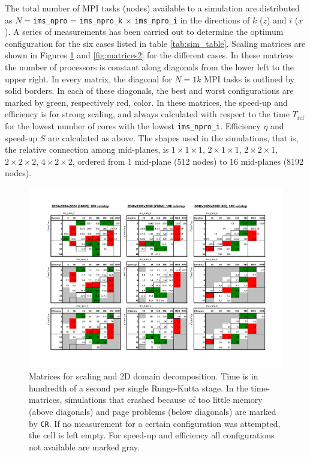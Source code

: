 The total number of MPI tasks (nodes) available to a simulation are distributed
as $N = $\texttt{ims\_npro} = \texttt{ims\_npro\_k}
$\times$ \texttt{ims\_npro\_i} in the directions of $k$ ($z$) and $i$ ($x$). A
series of measurements has been carried out to determine the optimum
configuration for the six cases listed in table
\ref{tab:sim_table}. Scaling matrices are shown in Figures \ref{fig:matrices1}
and \ref{fig:matrices2} for the different cases.  In these matrices the number
of processors is constant along diagonals from the lower left to the upper
right. In every matrix, the diagonal for $N=1k$ MPI tasks is outlined by solid
borders. In each of these diagonals, the best and worst configurations are
marked by green, respectively red, color. In these matrices, the speed-up and
efficiency is for strong scaling, and always calculated with respect to the time
$T_\text{ref}$ for the lowest number of cores with the
lowest \texttt{ims\_npro\_i}. Efficiency $\eta$ and speed-up $S$ are calculated
as above. The shapes used in the simulations, that is, the relative connection
among mid-planes, is $1\times 1\times 1$, $2\times 1\times 1$, $2\times 2\times
1$, $2\times 2\times 2$, $4\times 2\times 2$, ordered from 1 mid-plane (512
nodes) to 16 mid-planes (8192 nodes).

\begin{figure}
\begin{centering}
\includegraphics[height=0.9\textwidth,angle=90]{figs/matrices_1.pdf}
\caption{Matrices for scaling and 2D domain decomposition. Time is in hundredth
  of a second per single Runge-Kutta stage. In the time-matrices, simulations
  that crashed because of too little memory (above diagonals) and page problems
  (below diagonals) are marked by \texttt{CR}. If no measurement for a certain
  configuration was attempted, the cell is left empty. For speed-up and
  efficiency all configurations not available are marked gray.}
\label{fig:matrices1}
\end{centering}
\end{figure}

